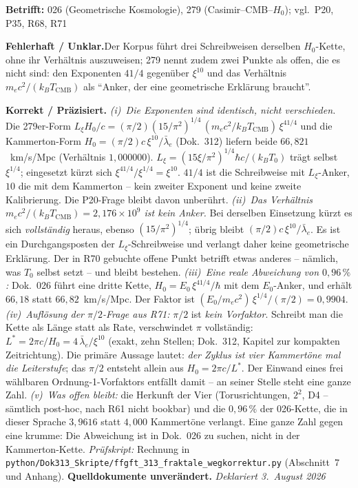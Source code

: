 \noindent\textbf{Betrifft:} 026 (Geometrische Kosmologie), 279
(Casimir--CMB--$H_0$); vgl.\ P20, P35, R68, R71

\smallskip\noindent\textbf{Fehlerhaft / Unklar.}\quad Der Korpus führt
drei Schreibweisen derselben $H_0$-Kette, ohne ihr Verhältnis
auszuweisen; 279 nennt zudem zwei Punkte als offen, die es nicht sind:
den Exponenten $41/4$ gegenüber $\xi^{10}$ und das Verhältnis
$m_ec^2/(k_BT_\text{CMB})$ als \enquote{Anker, der eine geometrische
Erklärung braucht}.

\smallskip\noindent\textbf{Korrekt / Präzisiert.}\quad
\emph{(i)~Die Exponenten sind identisch, nicht verschieden.} Die
279er-Form
$L_\xi H_0/c = (\pi/2)(15/\pi^2)^{1/4}\,(m_ec^2/k_BT_\text{CMB})\,
\xi^{41/4}$ und die Kammerton-Form $H_0 = (\pi/2)c\,\xi^{10}/
\bar\lambda_e$ (Dok.~312) liefern beide $66{,}821$~km/s/Mpc
(Verhältnis $1{,}000000$). $L_\xi = (15\xi/\pi^2)^{1/4}\hbar c/(k_BT_0)$
trägt selbst $\xi^{1/4}$; eingesetzt kürzt sich
$\xi^{41/4}/\xi^{1/4} = \xi^{10}$. $41/4$ ist die Schreibweise mit
$L_\xi$-Anker, $10$ die mit dem Kammerton -- kein zweiter Exponent und
keine zweite Kalibrierung. Die P20-Frage bleibt davon unberührt.
\emph{(ii)~Das Verhältnis $m_ec^2/(k_BT_\text{CMB}) = 2{,}176\times10^9$
ist kein Anker.} Bei derselben Einsetzung kürzt es sich
\emph{vollständig} heraus, ebenso $(15/\pi^2)^{1/4}$; übrig bleibt
$(\pi/2)c\,\xi^{10}/\bar\lambda_e$. Es ist ein Durchgangsposten der
$L_\xi$-Schreibweise und verlangt daher keine geometrische Erklärung.
Der in R70 gebuchte offene Punkt betrifft etwas anderes -- nämlich, was
$T_0$ selbst setzt -- und bleibt bestehen. \emph{(iii)~Eine reale
Abweichung von $0{,}96\,\%$:} Dok.~026 führt eine dritte Kette,
$H_0 = E_0\,\xi^{41/4}/\hbar$ mit dem $E_0$-Anker, und erhält
$66{,}18$ statt $66{,}82$~km/s/Mpc. Der Faktor ist
$(E_0/m_ec^2)\,\xi^{1/4}/(\pi/2) = 0{,}9904$. \emph{(iv)~Auflösung der
$\pi/2$-Frage aus R71:} $\pi/2$ ist \emph{kein Vorfaktor}. Schreibt
man die Kette als Länge statt als Rate, verschwindet $\pi$ vollständig:
$L^{*} = 2\pi c/H_0 = 4\,\bar\lambda_e/\xi^{10}$ (exakt, zehn
Stellen; Dok.~312, Kapitel zur kompakten Zeitrichtung). Die primäre Aussage
lautet: \emph{der Zyklus ist vier Kammertöne mal die Leiterstufe}; das
$\pi/2$ entsteht allein aus $H_0 = 2\pi c/L^{*}$. Der Einwand eines
frei wählbaren Ordnung-1-Vorfaktors entfällt damit -- an seiner Stelle
steht eine ganze Zahl. \emph{(v)~Was offen bleibt:} die Herkunft der
Vier (Torusrichtungen, $2^2$, D4 -- sämtlich post-hoc, nach R61 nicht
bookbar) und die $0{,}96\,\%$ der 026-Kette, die in dieser Sprache
$3{,}9616$ statt $4{,}000$ Kammertöne verlangt. Eine ganze Zahl gegen
eine krumme: Die Abweichung ist in Dok.~026 zu suchen, nicht in der
Kammerton-Kette. \emph{Prüfskript:} Rechnung in
\texttt{python/Dok313\_Skripte/ffgft\_313\_fraktale\_wegkorrektur.py}
(Abschnitt~7 und Anhang). \textbf{Quelldokumente unverändert.}
\emph{Deklariert 3.~August 2026}

